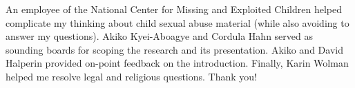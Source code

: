 \documentclass[authorversion,nonacm,screen]{acmart}
\begin{document}

\begin{abstract}

\end{abstract}


\maketitle









\begin{acks}
An employee of the National Center for Missing and Exploited Children helped
complicate my thinking about child sexual abuse material (while also avoiding to
answer my questions). Akiko Kyei-Aboagye and Cordula Hahn served as sounding
boards for scoping the research and its presentation. Akiko and David Halperin
provided on-point feedback on the introduction. Finally, Karin Wolman helped me
resolve legal and religious questions. Thank you!
\end{acks}





\appendix






\end{document}
